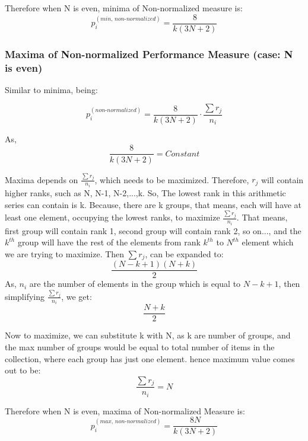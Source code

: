 \documentclass[a4paper,fleqn,review]{cas-sc}
\begin{document}
Therefore when N is even, minima of Non-normalized measure is:
\begin{equation}
	p_i^{(min, \, non\text{-}normalized)} = \frac{8}{k(3N + 2)}
	\label{eq:minima}
\end{equation}

\subsubsection{Maxima of Non-normalized Performance Measure (case: N is even)}
Similar to minima, being:

\begin{equation}
	p_i^{(non\text{-}normalized)} = \frac{8}{k(3N + 2)}\cdot \frac{\sum r_j}{n_i}
\end{equation}


As, 
\begin{equation}
	\frac{8}{k(3N + 2)} = Constant
\end{equation}

Maxima depends on $\frac{\sum r_j}{n_i}$, which needs to be maximized. Therefore, $r_j$ will contain higher ranks, such as N, N-1, N-2,...,k. So, The lowest rank in this arithmetic series can contain is k. Because, there are k groups, that means, each will have at least one element, occupying the lowest ranks, to maximize $\frac{\sum r_j}{n_i}$. That means, first group will contain rank 1, second group will contain rank 2, so on..., and the $k^{th}$ group will have the rest of the elements from rank $k^{th}$ to $N^{th}$ element which we are trying to maximize. Then $\sum r_j$, can be expanded to:
\begin{equation}
	\frac{(N-k+1)(N+k)}{2}
\end{equation}
As, $n_i$ are the number of elements in the group which is equal to $N-k+1$, then simplifying $\frac{\sum r_j}{n_i}$, we get:
\begin{equation}
	\frac{N+k}{2}
\end{equation}

Now to maximize, we can substitute k with N, as k are number of groups, and the max number of groups would be equal to total number of items in the collection, where each group has just one element.
hence maximum value comes out to be:
\begin{equation}
	\frac{\sum r_j}{n_i} = N
\end{equation}
 
Therefore when N is even, maxima of Non-normalized Measure is:
\begin{equation}
	\label{eq:maxima}
	p_i^{(max, \, non\text{-}normalized)} = \frac{8N}{k(3N + 2)}
\end{equation}
\end{document}
